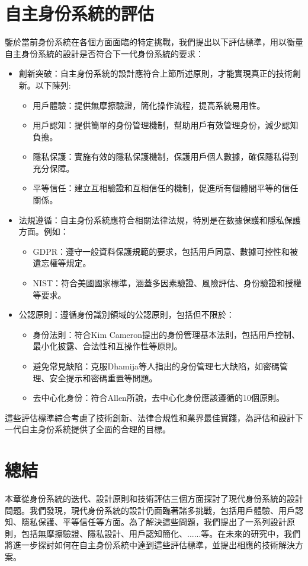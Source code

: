 \section{自主身份系統的評估}
鑒於當前身份系統在各個方面面臨的特定挑戰，我們提出以下評估標準，用以衡量自主身份系統的設計是否符合下一代身份系統的要求：
\begin{itemize}
  \item 創新突破：自主身份系統的設計應符合上節所述原則，才能實現真正的技術創新。以下陳列:
        \begin{itemize}
          \item 用戶體驗：提供無摩擦驗證，簡化操作流程，提高系統易用性。
          \item 用戶認知：提供簡單的身份管理機制，幫助用戶有效管理身份，減少認知負擔。
          \item 隱私保護：實施有效的隱私保護機制，保護用戶個人數據，確保隱私得到充分保障。
          \item 平等信任：建立互相驗證和互相信任的機制，促進所有個體間平等的信任關係。
        \end{itemize}
  \item 法規遵循：自主身份系統應符合相關法律法規，特別是在數據保護和隱私保護方面。例如：
        \begin{itemize}
          \item GDPR：遵守一般資料保護規範\cite{GDPR2016}的要求，包括用戶同意、數據可控性和被遺忘權等規定。
          \item NIST：符合美國國家標準\cite{NIST800-63-3}，涵蓋多因素驗證、風險評估、身份驗證和授權等要求。
        \end{itemize}
  \item 公認原則：遵循身份識別領域的公認原則，包括但不限於：
        \begin{itemize}
          \item 身份法則：符合Kim Cameron提出的身份管理基本法則\cite{cameron2005laws}，包括用戶控制、最小化披露、合法性和互操作性等原則。
          \item 避免常見缺陷：克服Dhamija等人\cite{dhamija2008sevenflaws}指出的身份管理七大缺陷，如密碼管理、安全提示和密碼重置等問題。
          \item 去中心化身份：符合Allen\cite{allen2016selfsovereign}所說，去中心化身份應該遵循的10個原則。
        \end{itemize}
\end{itemize}
這些評估標準綜合考慮了技術創新、法律合規性和業界最佳實踐，為評估和設計下一代自主身份系統提供了全面的合理的目標。
\section{總結}
本章從身份系統的迭代、設計原則和技術評估三個方面探討了現代身份系統的設計問題。我們發現，現代身份系統的設計仍面臨著諸多挑戰，包括用戶體驗、用戶認知、隱私保護、平等信任等方面。為了解決這些問題，我們提出了一系列設計原則，包括無摩擦驗證、隱私設計、用戶認知簡化、......等。在未來的研究中，我們將進一步探討如何在自主身份系統中達到這些評估標準，並提出相應的技術解決方案。